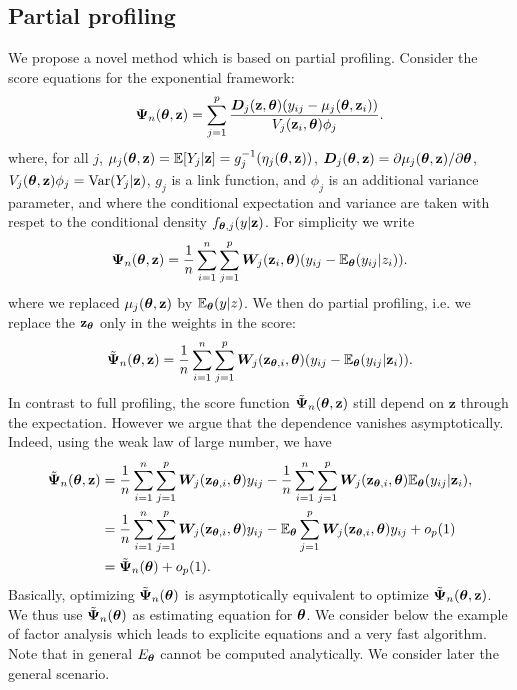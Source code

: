 \documentclass[twoside,11pt]{article}
\begin{document}
\subsection{Partial profiling}

We propose a novel method which is based on partial profiling.
Consider the score equations for the exponential framework:
\begin{equation}
\bm\Psi_n({\bm{\theta}}, {\bf z}) = \sum_{j=1}^p\frac{\bm D_j({\bf z}, {\bm{\theta}}) (y_{ij}- \mu_j({\bm{\theta}}, {\bf z}_i))}{V_j({\bf z}_i, {\bm{\theta}})\phi_j}.
\label{eqn:Psi}
\end{equation}
where, for all $j$, $\mu_j({\bm{\theta}}, {\bf z}) = \mathbb{E}[Y_{j}|{\bf z}] = g_j^{-1}(\eta_j({\bm{\theta}}, {\bf z}))$, $\bm D_j({\bm{\theta}}, {\bf z}) = \partial \mu_j({\bm{\theta}}, {\bf z})/\partial {\bm{\theta}}$, $V_j({\bm{\theta}}, {\bf z})\phi_j = \text{Var}(Y_{j}|{\bf z})$, $g_j$ is a link function, and $\phi_j$ is an additional variance parameter, and where the conditional expectation and variance are taken with respet to the conditional density $f_{{\bm{\theta}},j}(y|{\bf z})$.
For simplicity we write
\begin{equation}
\bm\Psi_n({\bm{\theta}}, {\bf z}) = \frac{1}{n} \sum_{i=1}^n\sum_{j=1}^p \bm W_j({\bf z}_i, {\bm{\theta}}) (y_{ij}- \mathbb{E}_{\bm{\theta}}(y_{ij}|z_i)).
\end{equation}
where we replaced $\mu_j({\bm{\theta}}, {\bf z})$ by $\mathbb{E}_{\bm{\theta}}(y|z)$.
We then do partial profiling, i.e. we replace the ${\bf z}_{\bm{\theta}}$ only in the weights in the score:
$$
\tilde{\bm\Psi}_n({\bm{\theta}}, {\bf z}) = \frac{1}{n} \sum_{i=1}^n\sum_{j=1}^p \bm W_j({\bf z}_{{\bm{\theta}},i}, {\bm{\theta}}) (y_{ij}- \mathbb{E}_{\bm{\theta}}(y_{ij}|{\bf z}_i)).
$$
In contrast to full profiling, the score function
$\tilde{\bm\Psi}_n({\bm{\theta}}, {\bf z})$ still depend on $\bm z$ through the expectation.
However we argue that the dependence vanishes asymptotically.
Indeed, using the weak law of large number, we have 
\begin{align*}
\tilde{\bm\Psi}_n({\bm{\theta}}, {\bf z}) 
&=
\frac{1}{n} \sum_{i=1}^n\sum_{j=1}^p \bm W_j({\bf z}_{{\bm{\theta}},i}, {\bm{\theta}}) y_{ij} - 
\frac{1}{n} \sum_{i=1}^n\sum_{j=1}^p 
\bm W_j({\bf z}_{{\bm{\theta}},i}, {\bm{\theta}}) \mathbb{E}_{\bm{\theta}}(y_{ij}|{\bf z}_i),\\    
&=
\frac{1}{n} \sum_{i=1}^n\sum_{j=1}^p \bm W_j({\bf z}_{{\bm{\theta}},i}, {\bm{\theta}}) y_{ij} - 
\mathbb{E}_{\bm{\theta}} \sum_{j=1}^p \bm W_j({\bf z}_{{\bm{\theta}},i}, {\bm{\theta}}) y_{ij} + o_p(1)\\
&= \tilde{\bm\Psi}_n({\bm{\theta}}) +o_p(1).
\end{align*}
Basically, optimizing $\tilde{\bm\Psi}_n({\bm{\theta}}) $ is asymptotically equivalent to optimize $\tilde{\bm\Psi}_n({\bm{\theta}}, {\bf z}) $.
We thus use $\tilde{\bm\Psi}_n({\bm{\theta}})$ as estimating equation for ${\bm{\theta}}$.
We consider below the example of factor analysis which leads to explicite equations and a very fast algorithm.
Note that in general $E_{\bm{\theta}}$ cannot be computed analytically.
We consider later the general scenario.
\end{document}

